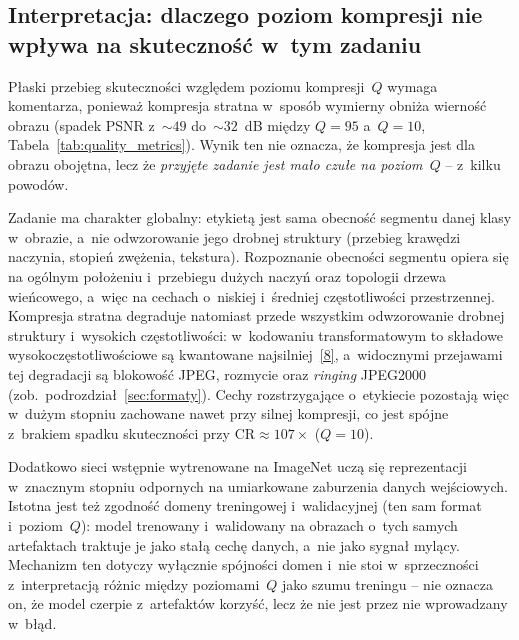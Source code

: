 \documentclass[12pt,a4paper]{article}
\newcommand{\mycite}[1]{\hyperlink{bib#1}{[#1]}}
\begin{document}
\subsection{Interpretacja: dlaczego poziom kompresji nie wpływa na skuteczność w~tym zadaniu}
\label{sec:plaskosc}

Płaski przebieg skuteczności względem poziomu kompresji~$Q$ wymaga komentarza, ponieważ kompresja stratna w~sposób wymierny obniża wierność obrazu (spadek PSNR z~${\sim}49$ do~${\sim}32$~dB między $Q=95$ a~$Q=10$, Tabela~\ref{tab:quality_metrics}). Wynik ten nie oznacza, że kompresja jest dla obrazu obojętna, lecz że \emph{przyjęte zadanie jest mało czułe na poziom~$Q$} -- z~kilku powodów.

Zadanie ma charakter globalny: etykietą jest sama obecność segmentu danej klasy w~obrazie, a~nie odwzorowanie jego drobnej struktury (przebieg krawędzi naczynia, stopień zwężenia, tekstura). Rozpoznanie obecności segmentu opiera się na ogólnym położeniu i~przebiegu dużych naczyń oraz topologii drzewa wieńcowego, a~więc na cechach o~niskiej i~średniej częstotliwości przestrzennej. Kompresja stratna degraduje natomiast przede wszystkim odwzorowanie drobnej struktury i~wysokich częstotliwości: w~kodowaniu transformatowym to składowe wysokoczęstotliwościowe są kwantowane najsilniej~\mycite{8}, a~widocznymi przejawami tej degradacji są blokowość JPEG, rozmycie oraz \textit{ringing} JPEG2000 (zob.~podrozdział~\ref{sec:formaty}). Cechy rozstrzygające o~etykiecie pozostają więc w~dużym stopniu zachowane nawet przy silnej kompresji, co jest spójne z~brakiem spadku skuteczności przy $\mathrm{CR}\approx107\times$ ($Q=10$).

Dodatkowo sieci wstępnie wytrenowane na ImageNet uczą się reprezentacji w~znacznym stopniu odpornych na umiarkowane zaburzenia danych wejściowych. Istotna jest też zgodność domeny treningowej i~walidacyjnej (ten sam format i~poziom~$Q$): model trenowany i~walidowany na obrazach o~tych samych artefaktach traktuje je jako stałą cechę danych, a~nie jako sygnał mylący. Mechanizm ten dotyczy wyłącznie spójności domen i~nie stoi w~sprzeczności z~interpretacją różnic między poziomami~$Q$ jako szumu treningu -- nie oznacza on, że model czerpie z~artefaktów korzyść, lecz że nie jest przez nie wprowadzany w~błąd.
\end{document}
